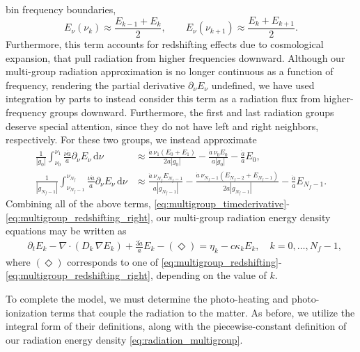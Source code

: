 \documentclass[10pt]{article}
\renewcommand{\(}{\left(}
\renewcommand{\)}{\right)}
\newcommand{\adot}{\dot{a}}
\newcommand{\Enu}{E_{\nu}}
\newcommand{\mn}{{\tt n}}
\begin{document}
bin frequency boundaries, 
\[
   \Enu(\nu_k) \approx \frac{E_{k-1}+E_k}{2}, \qquad
   \Enu(\nu_{k+1}) \approx \frac{E_{k}+E_{k+1}}{2}.
\]
Furthermore, this term accounts for redshifting
effects due to cosmological expansion, that pull radiation from higher
frequencies downward.  Although our multi-group radiation approximation
is no longer continuous as a function of frequency, rendering the
partial derivative $\partial_\nu\Enu$ undefined, we have used
integration by parts to instead consider this term as a radiation flux
from higher-frequency groups downward.  Furthermore, the first and
last radiation groups deserve special attention, since they do not
have left and right neighbors, respectively.  For these two groups, we
instead approximate
\begin{align}
 \label{eq:multigroup_redshifting_left}
   \frac{1}{|g_0|} \int_{\nu_0}^{\nu_1} \frac{\nu \adot}{a}\partial_{\nu}\Enu\,\mathrm d\nu
   &\approx
   \frac{\adot\, \nu_1 (E_0+E_1)}{2a|g_0|} -
   \frac{\adot\, \nu_0 E_0}{a|g_0|} - \frac{\adot}{a}E_0,
\\
 \label{eq:multigroup_redshifting_right}
   \frac{1}{|g_{N_f-1}|} \int_{\nu_{N_f-1}}^{\nu_{N_f}} \frac{\nu \adot}{a}\partial_{\nu}\Enu\,\mathrm d\nu
   &\approx
   \frac{\adot\, \nu_{N_f} E_{N_f-1}}{a|g_{N_f-1}|} -
   \frac{\adot\, \nu_{N_f-1} (E_{N_f-2}+E_{N_f-1})}{2a|g_{N_f-1}|} - \frac{\adot}{a}E_{N_f-1}.
\end{align}
Combining all of the above terms,
\eqref{eq:multigroup_timederivative}-\eqref{eq:multigroup_redshifting_right},
our multi-group radiation energy density equations may be written as
\begin{align}
  \label{eq:mgfld_multigroup}
  &\partial_{t} E_k - \nabla\cdot(D_k\,\nabla E_k) 
      + \frac{3 \adot}{a} E_k - (\Diamond)
    = \eta_k - c \kappa_k E_k,\quad k=0,\ldots,N_f-1,
\end{align}
where $(\Diamond)$ corresponds to one of
\eqref{eq:multigroup_redshifting}-\eqref{eq:multigroup_redshifting_right},
depending on the value of $k$.

To complete the model, we must determine the photo-heating and
photo-ionization terms that couple the radiation to the matter.  As
before, we utilize the integral form of their definitions, along with
the piecewise-constant definition of our radiation energy density
\eqref{eq:radiation_multigroup}.  
\end{document}
